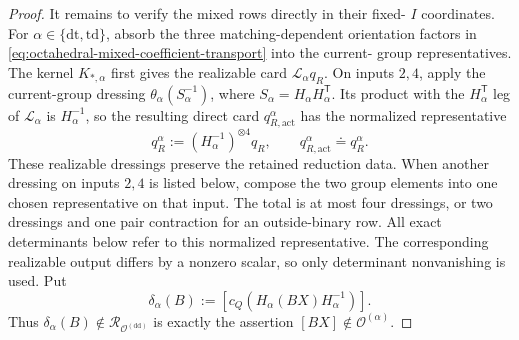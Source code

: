 \documentclass[11pt,letterpaper,onecolumn]{article}
\theoremstyle{plain}
\theoremstyle{definition}
\theoremstyle{remark}
\newcommand{\OctDD}{{\mathcal O^{(\mathrm{dd})}}}
\newcommand{\OctForm}[1]{{\mathcal O^{(#1)}}}
\begin{document}
\begin{proof}
It remains to verify the mixed rows directly in their fixed-
\(I\) coordinates.  For \(\alpha\in\{\mathrm{dt},\mathrm{td}\}\), absorb the three
matching-dependent orientation factors in
\cref{eq:octahedral-mixed-coefficient-transport} into the current-
group representatives.  The kernel \(K_{*,\alpha}\) first gives the
realizable card \(\mathcal L_\alpha q_R\).  On inputs \(2,4\), apply the
current-group dressing \(\theta_\alpha(S_\alpha^{-1})\), where
\(S_\alpha=H_\alpha H_\alpha^{\mathsf T}\).  Its product with the
\(H_\alpha^{\mathsf T}\) leg of \(\mathcal L_\alpha\) is
\(H_\alpha^{-1}\), so the resulting direct card
\(q_{R,\mathrm{act}}^\alpha\) has the normalized representative
\begin{equation}
 q_R^\alpha:=(H_\alpha^{-1})^{\otimes4}q_R,
 \qquad q_{R,\mathrm{act}}^\alpha\doteq q_R^\alpha.
 \label{eq:cert-S4-mixed-direct-card}
\end{equation}
These realizable dressings preserve the retained reduction data.  When another dressing on inputs \(2,4\) is listed
below, compose the two group elements into one chosen representative on
that input.  The total is at most four dressings, or two dressings and one
pair contraction for an outside-binary row.  All exact
determinants below refer to this normalized representative. The corresponding
realizable output differs by a nonzero scalar, so only determinant
nonvanishing is used.  Put
\[
 \delta_\alpha(B):=
 [c_Q(H_\alpha(BX)H_\alpha^{-1})].
\]
Thus \(\delta_\alpha(B)\notin\mathcal R_{\OctDD}\) is exactly the assertion
\([BX]\notin\OctForm{\alpha}\).


\end{proof}
\end{document}
